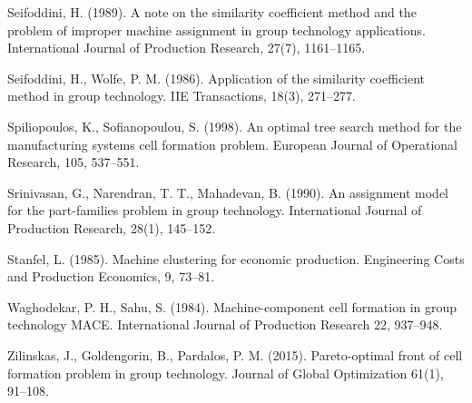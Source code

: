 \documentclass[citeauthoryear]{llncs}
\begin{document}
\begin{thebibliography}{99}
 Seifoddini, H. (1989). A note on the similarity coefficient method and the problem of improper machine assignment in group technology applications. International Journal of Production Research, 27(7), 1161--1165.

 Seifoddini, H., Wolfe, P. M. (1986). Application of the similarity coefficient method in group technology. IIE Transactions, 18(3), 271--277.

 Spiliopoulos, K., Sofianopoulou, S. (1998). An optimal tree search method for the manufacturing systems cell formation problem. European Journal of Operational Research, 105, 537--551.
    
Srinivasan, G., Narendran, T. T., Mahadevan, B. (1990). An assignment model for the part-families problem in group technology. International Journal of Production Research, 28(1), 145--152.

 Stanfel, L. (1985). Machine clustering for economic production. Engineering Costs and Production Economics, 9, 73--81.

 Waghodekar, P. H., Sahu, S. (1984). Machine-component cell formation in group technology MACE. International Journal of Production Research 22, 937--948.

 Zilinskas, J., Goldengorin, B., Pardalos, P. M. (2015). Pareto-optimal front of cell formation problem in group technology. Journal of Global Optimization 61(1), 91--108.

\end{thebibliography}
\end{document}
